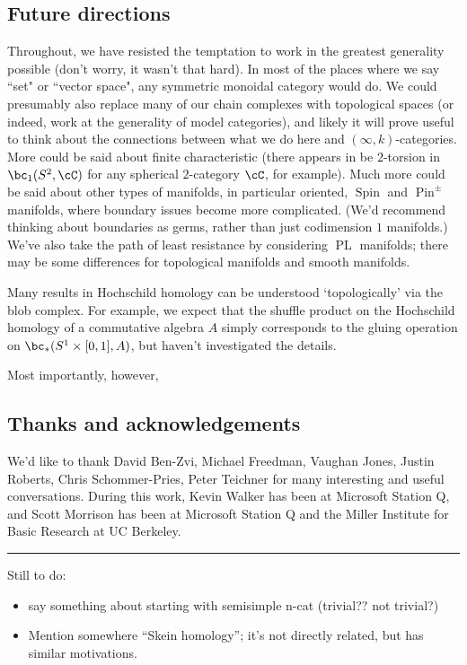 \subsection{Future directions}
\label{sec:future}
Throughout, we have resisted the temptation to work in the greatest generality possible (don't worry, it wasn't that hard). 
In most of the places where we say ``set" or ``vector space", any symmetric monoidal category would do. We could presumably also replace many of our chain complexes with topological spaces (or indeed, work at the generality of model categories), and likely it will prove useful to think about the connections between what we do here and $(\infty,k)$-categories.
More could be said about finite characteristic (there appears in be $2$-torsion in $\bc_1(S^2, \cC)$ for any spherical $2$-category $\cC$, for example). Much more could be said about other types of manifolds, in particular oriented, $\operatorname{Spin}$ and $\operatorname{Pin}^{\pm}$ manifolds, where boundary issues become more complicated. (We'd recommend thinking about boundaries as germs, rather than just codimension $1$ manifolds.) We've also take the path of least resistance by considering $\operatorname{PL}$ manifolds; there may be some differences for topological manifolds and smooth manifolds.

Many results in Hochschild homology can be understood `topologically' via the blob complex. For example, we expect that the shuffle product on the Hochschild homology of a commutative algebra $A$ simply corresponds to the gluing operation on $\bc_*(S^1 \times [0,1], A)$, but haven't investigated the details.

Most importantly, however,  


\subsection{Thanks and acknowledgements}
We'd like to thank David Ben-Zvi, Michael Freedman, Vaughan Jones, Justin Roberts, Chris Schommer-Pries, Peter Teichner  for many interesting and useful conversations. During this work, Kevin Walker has been at Microsoft Station Q, and Scott Morrison has been at Microsoft Station Q and the Miller Institute for Basic Research at UC Berkeley.


\medskip\hrule\medskip

Still to do:
\begin{itemize}
\item say something about starting with semisimple n-cat (trivial?? not trivial?)
\item Mention somewhere \cite{MR1624157} ``Skein homology''; it's not directly related, but has similar motivations.
\end{itemize}

